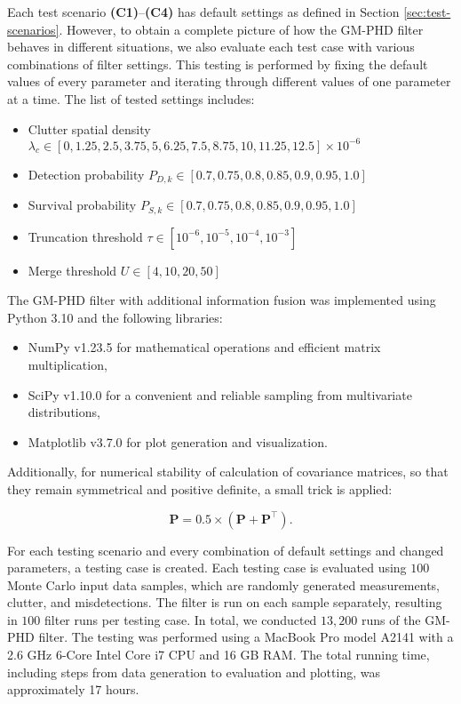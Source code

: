 Each test scenario \textbf{(C1)}--\textbf{(C4)} has default settings as defined in Section \ref{sec:test-scenarios}. However, to obtain a complete picture of how the GM-PHD filter behaves in different situations, we also evaluate each test case with various combinations of filter settings. This testing is performed by fixing the default values of every parameter and iterating through different values of one parameter at a time. The list of tested settings includes:

\begin{itemize}
    \item Clutter spatial density $\lambda_c \in [0, 1.25, 2.5, 3.75, 5, 6.25, 7.5, 8.75, 10, 11.25, 12.5] \times 10^{-6}$
    \item Detection probability $P_{D,k} \in [0.7, 0.75, 0.8, 0.85, 0.9, 0.95, 1.0]$
    \item Survival probability $P_{S,k} \in [0.7, 0.75, 0.8, 0.85, 0.9, 0.95, 1.0]$
    \item Truncation threshold $\tau \in [10^{-6}, 10^{-5}, 10^{-4}, 10^{-3}]$
    \item Merge threshold $U \in [4, 10, 20, 50]$
\end{itemize}

The GM-PHD filter with additional information fusion was implemented using Python 3.10 and the following libraries:

\begin{itemize}
    \item NumPy v1.23.5 for mathematical operations and efficient matrix multiplication,
    \item SciPy v1.10.0 for a convenient and reliable sampling from multivariate distributions,
    \item Matplotlib v3.7.0 for plot generation and visualization.
\end{itemize}

Additionally, for numerical stability of calculation of covariance matrices, so that they remain symmetrical and positive definite, a small trick is applied:

\begin{equation}
    \mathbf{P} = 0.5 \times (\mathbf{P} + \mathbf{P}^\intercal).
\end{equation}

For each testing scenario and every combination of default settings and changed parameters, a testing case is created. Each testing case is evaluated using $100$ Monte Carlo input data samples, which are randomly generated measurements, clutter, and misdetections. The filter is run on each sample separately, resulting in $100$ filter runs per testing case. In total, we conducted $13,200$ runs of the GM-PHD filter. The testing was performed using a MacBook Pro model A2141 with a 2.6 GHz 6-Core Intel Core i7 CPU and 16 GB RAM. The total running time, including steps from data generation to evaluation and plotting, was approximately 17 hours.
